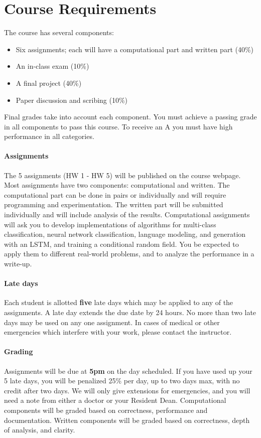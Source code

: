\documentclass[11pt]{article}
\begin{document}
\vspace {0.25cm}
\section{Course Requirements}

The course has several components:

\begin{itemize}
\item Six assignments; each will have a computational part and written part (40\%)
\item An in-class exam (10\%)
\item A final project  (40\%)
\item Paper discussion and scribing (10\%)
\end{itemize}


\noindent Final grades take into account each component. You must
achieve a passing grade in all components to pass this course. To
receive an A you must have high performance in all categories.

\paragraph{Assignments}

The 5 assignments (HW 1 - HW 5) will be published on the course
webpage. Most assignments have two components: computational and
written. The computational part can be done in pairs or individually
and will require programming and experimentation. The written part
will be submitted individually and will include analysis of the
results.  Computational assignments will ask you to develop
implementations of algorithms for multi-class classification, neural
network classification, language modeling, and generation with an
LSTM, and training a conditional random field. You be expected to
apply them to different real-world problems, and to analyze the
performance in a write-up.

\paragraph{Late days} Each student is allotted \textbf{five} late days
which may be applied to any of the assignments.  A late day extends the
due date by 24 hours. No more than two late days may be used on any
one assignment. In cases of medical or other emergencies which
interfere with your work, please contact the
instructor.

\paragraph{Grading} Assignments will be due at \textbf{5pm} on the day
scheduled. If you have used up your 5 late days, you will be penalized
25\% per day, up to two days max, with no credit after two days. We
will only give extensions for emergencies, and you will need a note
from either a doctor or your Resident Dean. Computational components
will be graded based on correctness, performance and documentation.
Written components will be graded based on correctness, depth of
analysis, and clarity.
\end{document}
